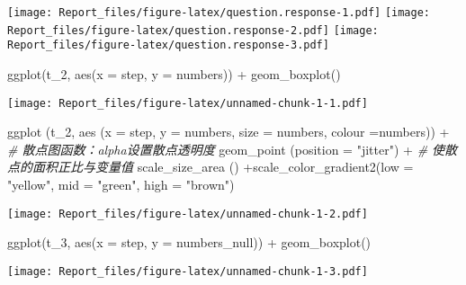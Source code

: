 \documentclass[
]{article}
\newenvironment{Shaded}{\begin{snugshade}}{\end{snugshade}}
\newcommand{\AttributeTok}[1]{\textcolor[rgb]{0.77,0.63,0.00}{#1}}
\newcommand{\CommentTok}[1]{\textcolor[rgb]{0.56,0.35,0.01}{\textit{#1}}}
\newcommand{\FunctionTok}[1]{\textcolor[rgb]{0.00,0.00,0.00}{#1}}
\newcommand{\NormalTok}[1]{#1}
\newcommand{\SpecialCharTok}[1]{\textcolor[rgb]{0.00,0.00,0.00}{#1}}
\newcommand{\StringTok}[1]{\textcolor[rgb]{0.31,0.60,0.02}{#1}}
\begin{document}
\texttt{[image: Report\_files/figure-latex/question.response-1.pdf]}
\texttt{[image: Report\_files/figure-latex/question.response-2.pdf]}
\texttt{[image: Report\_files/figure-latex/question.response-3.pdf]}

\begin{Shaded}
\begin{Highlighting}[]
\FunctionTok{ggplot}\NormalTok{(t\_2, }\FunctionTok{aes}\NormalTok{(}\AttributeTok{x =}\NormalTok{ step, }\AttributeTok{y =}\NormalTok{ numbers)) }\SpecialCharTok{+} \FunctionTok{geom\_boxplot}\NormalTok{() }
\end{Highlighting}
\end{Shaded}

\texttt{[image: Report\_files/figure-latex/unnamed-chunk-1-1.pdf]}

\begin{Shaded}
\begin{Highlighting}[]
\FunctionTok{ggplot}\NormalTok{ (t\_2, }\FunctionTok{aes}\NormalTok{ (}\AttributeTok{x =}\NormalTok{ step, }\AttributeTok{y =}\NormalTok{ numbers, }\AttributeTok{size =}\NormalTok{ numbers, }\AttributeTok{colour =}\NormalTok{numbers)) }\SpecialCharTok{+}
  \CommentTok{\# 散点图函数：alpha设置散点透明度}
  \FunctionTok{geom\_point}\NormalTok{ (}\AttributeTok{position =} \StringTok{"jitter"}\NormalTok{) }\SpecialCharTok{+}
  \CommentTok{\# 使散点的面积正比与变量值}
  \FunctionTok{scale\_size\_area}\NormalTok{ () }\SpecialCharTok{+}\FunctionTok{scale\_color\_gradient2}\NormalTok{(}\AttributeTok{low =} \StringTok{"yellow"}\NormalTok{, }\AttributeTok{mid =} \StringTok{"green"}\NormalTok{, }\AttributeTok{high =} \StringTok{"brown"}\NormalTok{)}
\end{Highlighting}
\end{Shaded}

\texttt{[image: Report\_files/figure-latex/unnamed-chunk-1-2.pdf]}

\begin{Shaded}
\begin{Highlighting}[]
\FunctionTok{ggplot}\NormalTok{(t\_3, }\FunctionTok{aes}\NormalTok{(}\AttributeTok{x =}\NormalTok{ step, }\AttributeTok{y =}\NormalTok{ numbers\_null)) }\SpecialCharTok{+}  \FunctionTok{geom\_boxplot}\NormalTok{()}
\end{Highlighting}
\end{Shaded}

\texttt{[image: Report\_files/figure-latex/unnamed-chunk-1-3.pdf]}
\end{document}
